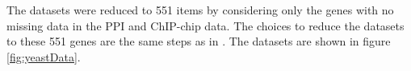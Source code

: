 \documentclass[]{article}
\begin{document}

The datasets were reduced to 551 items by considering only the genes with no missing data in the PPI and ChIP-chip data. The choices to reduce the datasets to these 551 genes are the same steps as in \cite{kirk2012bayesian}. The datasets are shown in figure \ref{fig:yeastData}.

\end{document}
